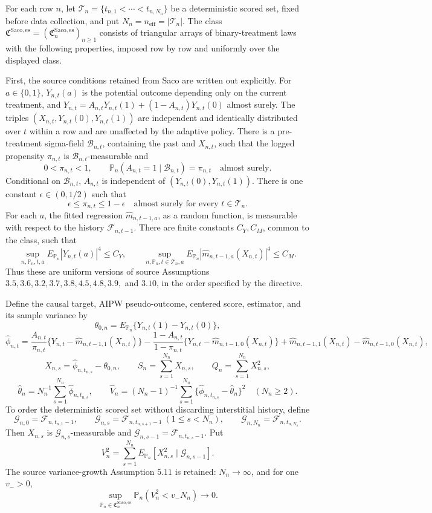For each row \(n\), let \(\mathcal T_n=\{t_{n,1}<\cdots<t_{n,N_n}\}\) be a deterministic scored set, fixed before data collection, and put \(N_n=n_{\mathrm{eff}}=|\mathcal T_n|\).  The class \(\mathfrak C^{\mathrm{Saco,es}}=(\mathfrak C_n^{\mathrm{Saco,es}})_{n\ge1}\) consists of triangular arrays of binary-treatment laws with the following properties, imposed row by row and uniformly over the displayed class.

First, the source conditions retained from Saco are written out explicitly.  For \(a\in\{0,1\}\), \(Y_{n,t}(a)\) is the potential outcome depending only on the current treatment, and \(Y_{n,t}=A_{n,t}Y_{n,t}(1)+(1-A_{n,t})Y_{n,t}(0)\) almost surely.  The triples \((X_{n,t},Y_{n,t}(0),Y_{n,t}(1))\) are independent and identically distributed over \(t\) within a row and are unaffected by the adaptive policy.  There is a pre-treatment sigma-field \(\mathcal B_{n,t}\), containing the past and \(X_{n,t}\), such that the logged propensity \(\pi_{n,t}\) is \(\mathcal B_{n,t}\)-measurable and
\[
0<\pi_{n,t}<1,\qquad
\mathbb P_n(A_{n,t}=1\mid\mathcal B_{n,t})=\pi_{n,t}\quad\text{almost surely}.
\]
Conditional on \(\mathcal B_{n,t}\), \(A_{n,t}\) is independent of \((Y_{n,t}(0),Y_{n,t}(1))\).  There is one constant \(\epsilon\in(0,1/2)\) such that
\[
\epsilon\le\pi_{n,t}\le1-\epsilon
\quad\text{almost surely for every }t\in\mathcal T_n.
\]
For each \(a\), the fitted regression \(\widehat m_{n,t-1,a}\), as a random function, is measurable with respect to the history \(\mathcal F_{n,t-1}\).  There are finite constants \(C_Y,C_M\), common to the class, such that
\[
\sup_{n,\mathbb P_n,t,a}E_{\mathbb P_n}|Y_{n,t}(a)|^4\le C_Y,\qquad
\sup_{n,\mathbb P_n,t\in\mathcal T_n,a}
E_{\mathbb P_n}|\widehat m_{n,t-1,a}(X_{n,t})|^4\le C_M.
\]
Thus these are uniform versions of source Assumptions \(3.5,3.6,3.2,3.7,3.8,4.5,4.8,3.9,\) and \(3.10\), in the order specified by the directive.

Define the causal target, AIPW pseudo-outcome, centered score, estimator, and its sample variance by
\[
\theta_{0,n}=E_{\mathbb P_n}\{Y_{n,t}(1)-Y_{n,t}(0)\},
\]
\[
\widehat\phi_{n,t}=\frac{A_{n,t}}{\pi_{n,t}}
\{Y_{n,t}-\widehat m_{n,t-1,1}(X_{n,t})\}
-\frac{1-A_{n,t}}{1-\pi_{n,t}}
\{Y_{n,t}-\widehat m_{n,t-1,0}(X_{n,t})\}
+\widehat m_{n,t-1,1}(X_{n,t})-\widehat m_{n,t-1,0}(X_{n,t}),
\]
\[
X_{n,s}=\widehat\phi_{n,t_{n,s}}-\theta_{0,n},\qquad
S_n=\sum_{s=1}^{N_n}X_{n,s},\qquad
Q_n=\sum_{s=1}^{N_n}X_{n,s}^2,
\]
\[
\widehat\theta_n=N_n^{-1}\sum_{s=1}^{N_n}\widehat\phi_{n,t_{n,s}},\qquad
\widehat V_n=(N_n-1)^{-1}\sum_{s=1}^{N_n}
\{\widehat\phi_{n,t_{n,s}}-\widehat\theta_n\}^2
\quad(N_n\ge2).
\]
To order the deterministic scored set without discarding interstitial history, define
\[
\mathcal G_{n,0}=\mathcal F_{n,t_{n,1}-1},\qquad
\mathcal G_{n,s}=\mathcal F_{n,t_{n,s+1}-1}\ (1\le s<N_n),\qquad
\mathcal G_{n,N_n}=\mathcal F_{n,t_{n,N_n}}.
\]
Then \(X_{n,s}\) is \(\mathcal G_{n,s}\)-measurable and \(\mathcal G_{n,s-1}=\mathcal F_{n,t_{n,s}-1}\).  Put
\[
V_n^2=\sum_{s=1}^{N_n}E_{\mathbb P_n}[X_{n,s}^2\mid\mathcal G_{n,s-1}].
\]
The source variance-growth Assumption \(5.11\) is retained: \(N_n\to\infty\), and for one \(v_->0\),
\[
\sup_{\mathbb P_n\in\mathfrak C_n^{\mathrm{Saco,es}}}
\mathbb P_n(V_n^2<v_-N_n)\longrightarrow0.
\]

